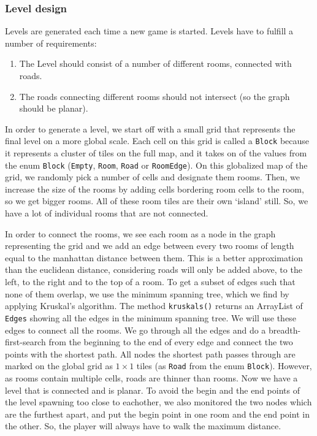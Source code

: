 \documentclass[../main.tex]{subfiles}
\begin{document}
		\subsubsection{Level design}\label{sec: level design}
		Levels are generated each time a new game is started. Levels have to fulfill a number of requirements:
		\begin {enumerate}
			\item {The Level should consist of a number of different rooms, connected with roads}.
			\item {The roads connecting different rooms should not intersect (so the graph should be planar).}
		\end {enumerate}
		In order to generate a level, we start off with a small grid that represents the final level on a more global scale. Each cell on this grid is called a \texttt{Block} because it represents a cluster of tiles on the full map, and it takes on of the values from the enum \texttt{Block} (\texttt{Empty}, \texttt{Room}, \texttt{Road} or \texttt{RoomEdge}). On this globalized map of the grid, we randomly pick a number of cells and designate them rooms. Then, we increase the size of the rooms by adding cells bordering room cells to the room, so we get bigger rooms. All of these room tiles are their own `island' still. So, we have a lot of individual rooms that are not connected. 
		
		In order to connect the rooms, we see each room as a node in the graph representing the grid and we add an edge between every two rooms of length equal to the manhattan distance between them. This is a better approximation than the euclidean distance, considering roads will only be added above, to the left, to the right and to the top of a room. To get a subset of edges such that none of them overlap, we use the minimum spanning tree, which we find by applying Kruskal's algorithm. The method \texttt{kruskals()} returns an ArrayList of \texttt{Edges} showing all the edges in the minimum spanning tree. We will use these edges to connect all the rooms. We go through all the edges and do a breadth-first-search from the beginning to the end of every edge and connect the two points with the shortest path. All nodes the shortest path passes through are marked on the global grid as $1\times1$ tiles (as \texttt{Road} from the enum \texttt{Block}). However, as rooms contain multiple cells, roads are thinner than rooms. Now we have a level that is connected and is planar. To avoid the begin and the end points of the level spawning too close to eachother, we also monitored the two nodes which are the furthest apart, and put the begin point in one room and the end point in the other. So, the player will always have to walk the maximum distance. 
		
\end{document}
